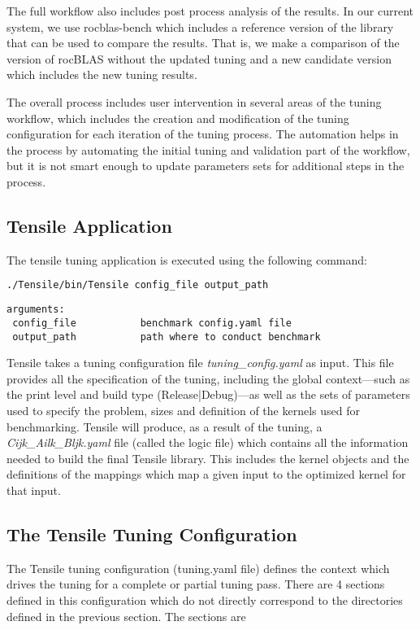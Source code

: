 \documentclass[]{article}
\begin{document}
The full workflow also includes post process analysis of the results. In our current system, we use rocblas-bench which includes a reference version of the library that can be used to compare the results. That is, we make a comparison of the version of rocBLAS without the updated tuning and a new candidate version which includes the new tuning results.

The overall process includes user intervention in several areas of the tuning workflow, which includes the creation and modification of the tuning configuration for each iteration of the tuning process. The automation helps in the process by automating the initial tuning and validation part of the workflow, but it is not smart enough to update parameters sets for additional steps in the process.

\subsection{Tensile Application}
The tensile tuning application is executed using the following command:

\begin{lstlisting}[language=bash]
./Tensile/bin/Tensile config_file output_path
\end{lstlisting}

\begin{verbatim}
arguments:
 config_file           benchmark config.yaml file
 output_path           path where to conduct benchmark
\end{verbatim}

Tensile takes a tuning configuration file \emph{tuning\_config.yaml} as input. This file provides all the specification of the tuning, including the global context---such as the print level and build type (Release|Debug)---as well as the sets of parameters used to specify the problem, sizes and definition of the kernels used for benchmarking. Tensile will produce, as a result of the tuning, a \emph{Cijk\_Ailk\_Bljk.yaml} file (called the logic file) which contains all the information needed to build the final Tensile library. This includes the kernel objects and the definitions of the mappings which map a given input to the optimized kernel for that input.


\subsection{The Tensile Tuning Configuration}

The Tensile tuning configuration (tuning.yaml file) defines the context which drives the tuning for a complete or partial tuning pass. There are 4 sections defined in this configuration which do not directly correspond to the directories defined in the previous section. The sections are
\end{document}
